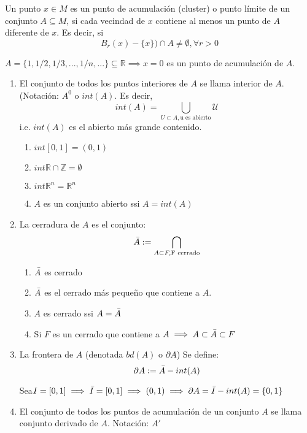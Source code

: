 \begin{definition}
Un punto $x\in M$ es un punto de acumulación (cluster) o punto límite de un conjunto $A\subseteq M$, si cada vecindad de $x$ contiene al menos un punto de $A$ diferente de $x$. Es decir, si 
$$B_r(x)-\{x\})\cap A\neq \emptyset,\forall r>0$$
\begin{example}
$A=\{1,1/2,1/3,...,1/n,...\}\subseteq \mathbb{R}\implies x=0$ es un punto de acumulación de $A$. 
\end{example}
\end{definition}

\begin{definition}
\begin{enumerate}
    \item El conjunto de todos los puntos interiores de $A$ se llama interior de $A$. (Notación: $A^{0}$ o $int(A)$. %
    Es decir, $$int(A)=\bigcup_{U\subset A, \text{u es abierto}}\mathcal{U}$$
    i.e. $int(A)$ es el abierto más grande contenido. \begin{example}
\begin{enumerate}
    \item $int[0,1]=(0,1)$
    \item $int \mathbb{R}\cap \mathbb{Z}=\emptyset$
    \item $int\mathbb{R}^n=\mathbb{R}^n$
    \item $A$ es un conjunto abierto ssi $A=int(A)$
\end{enumerate}
\end{example}
\item La cerradura de $A$ es el conjunto: $$\Bar{A}:=\bigcap_{A\subset F, \text{F cerrado}}$$\begin{remark}
\begin{enumerate}
    \item $\Bar{A}$ es cerrado
    \item $\Bar{A}$ es el cerrado más pequeño que contiene a $A$.
    \item $A$ es cerrado ssi $A=\Bar{A}$
    \item Si $F$ es un cerrado que contiene a $A\implies A\subset \Bar{A}\subset F$
\end{enumerate}
\end{remark}
\item La frontera de $A$ (denotada $bd(A)$ o $\partial A$) Se define: 
$$\partial A:= \Bar{A}-int(A)$$
\begin{example}
Sea$I=[0,1]\implies \Bar{I}=[0,1]\implies (0,1)\implies \partial A=\Bar{I}-int(A)=\{0,1\}$
\end{example}
\item El conjunto de todos los puntos de acumulación de un conjunto $A$ se llama conjunto derivado de $A$. Notación: $A'$
\end{enumerate}
\end{definition}


